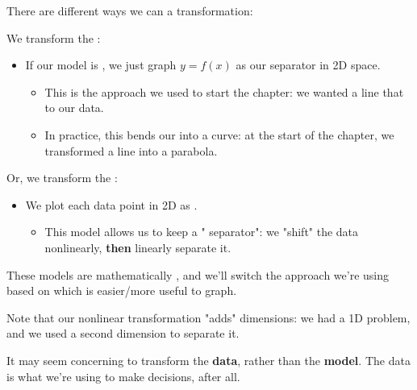         \begin{clarification}
            There are  different ways we can  a transformation:

            We transform the :
            
            \begin{itemize}
                \item \miniex If our model is , we just graph $y=f(x)$ as our separator in 2D space.
                    
                    \begin{itemize}
                        \item This is the approach we used to start the chapter: we wanted a line that  to our data.
                        \item In practice, this bends our  into a curve: at the start of the chapter, we transformed a line into a parabola.
                    \end{itemize}
            \end{itemize}
            
            Or, we transform the :
            
            \begin{itemize}
                \item \miniex We plot each data point in 2D as \orgg{$[x, -x^2+2]$}.
                    \begin{itemize}
                        \item This model allows us to keep a " separator": we "shift" the data nonlinearly, \textbf{then} linearly separate it.
                    \end{itemize}
            \end{itemize}

            These models are mathematically , and we'll switch the approach we're using based on which is easier/more useful to graph.
        \end{clarification}


        Note that our nonlinear transformation "adds" dimensions: we had a 1D problem, and we used a second dimension to separate it.

        It may seem concerning to transform the \textbf{data}, rather than the \textbf{model}. The data is what we're using to make decisions, after all. 
        
